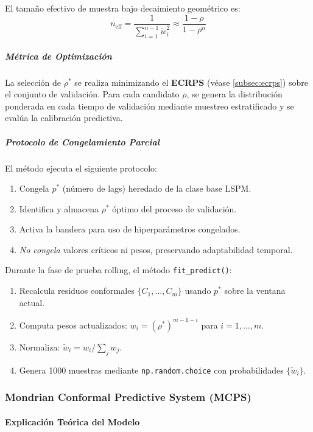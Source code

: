 El tamaño efectivo de muestra bajo decaimiento geométrico es:
\begin{equation}
n_{\text{eff}} = \frac{1}{\sum_{i=1}^{n-1} \tilde{w}_i^2} \approx \frac{1-\rho}{1-\rho^n}
\end{equation}

\subparagraph{Métrica de Optimización}
La selección de $\rho^*$ se realiza minimizando el \textbf{ECRPS} (véase \ref{subsec:ecrps}) sobre el conjunto de validación. Para cada candidato $\rho$, se genera la distribución ponderada en cada tiempo de validación mediante muestreo estratificado y se evalúa la calibración predictiva.

\subparagraph{Protocolo de Congelamiento Parcial}
El método ejecuta el siguiente protocolo:
\begin{enumerate}
    \item Congela $p^*$ (número de lags) heredado de la clase base LSPM.
    \item Identifica y almacena $\rho^*$ óptimo del proceso de validación.
    \item Activa la bandera para uso de hiperparámetros congelados.
    \item \textit{No congela} valores críticos ni pesos, preservando adaptabilidad temporal.
\end{enumerate}

Durante la fase de prueba rolling, el método \texttt{fit\_predict()}:
\begin{enumerate}
    \item Recalcula residuos conformales $\{C_1, \dots, C_m\}$ usando $p^*$ sobre la ventana actual.
    \item Computa pesos actualizados: $w_i = (\rho^*)^{m-1-i}$ para $i = 1, \dots, m$.
    \item Normaliza: $\tilde{w}_i = w_i / \sum_j w_j$.
    \item Genera 1000 muestras mediante \texttt{np.random.choice} con probabilidades $\{\tilde{w}_i\}$.
\end{enumerate}


\subsubsection{Mondrian Conformal Predictive System (MCPS)}
\label{subsec:MCPS}
\paragraph{Explicación Teórica del Modelo}


